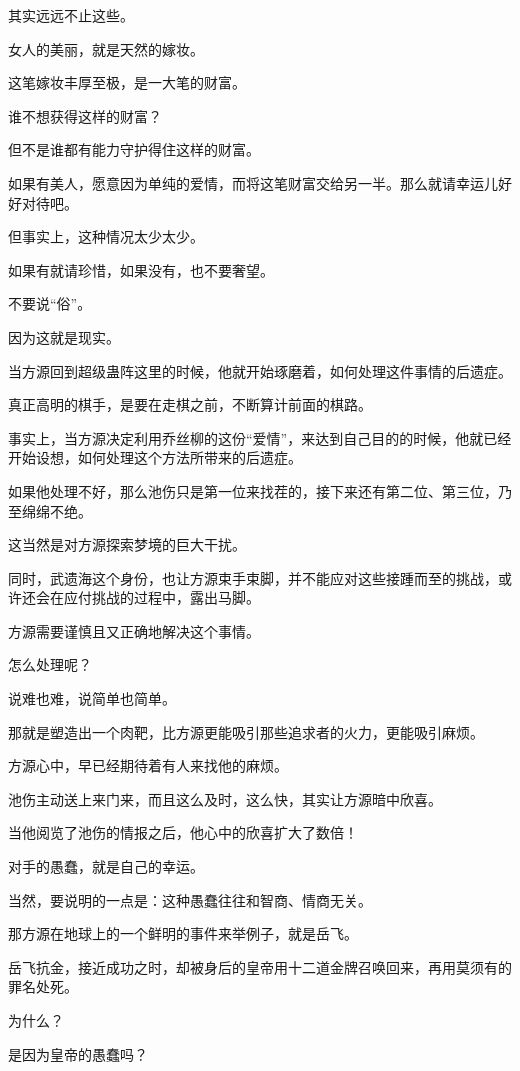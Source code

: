\begin{this_body}
其实远远不止这些。

女人的美丽，就是天然的嫁妆。

这笔嫁妆丰厚至极，是一大笔的财富。

谁不想获得这样的财富？

但不是谁都有能力守护得住这样的财富。

如果有美人，愿意因为单纯的爱情，而将这笔财富交给另一半。那么就请幸运儿好好对待吧。

但事实上，这种情况太少太少。

如果有就请珍惜，如果没有，也不要奢望。

不要说“俗”。

因为这就是现实。

当方源回到超级蛊阵这里的时候，他就开始琢磨着，如何处理这件事情的后遗症。

真正高明的棋手，是要在走棋之前，不断算计前面的棋路。

事实上，当方源决定利用乔丝柳的这份“爱情”，来达到自己目的的时候，他就已经开始设想，如何处理这个方法所带来的后遗症。

如果他处理不好，那么池伤只是第一位来找茬的，接下来还有第二位、第三位，乃至绵绵不绝。

这当然是对方源探索梦境的巨大干扰。

同时，武遗海这个身份，也让方源束手束脚，并不能应对这些接踵而至的挑战，或许还会在应付挑战的过程中，露出马脚。

方源需要谨慎且又正确地解决这个事情。

怎么处理呢？

说难也难，说简单也简单。

那就是塑造出一个肉靶，比方源更能吸引那些追求者的火力，更能吸引麻烦。

方源心中，早已经期待着有人来找他的麻烦。

池伤主动送上来门来，而且这么及时，这么快，其实让方源暗中欣喜。

当他阅览了池伤的情报之后，他心中的欣喜扩大了数倍！

对手的愚蠢，就是自己的幸运。

当然，要说明的一点是：这种愚蠢往往和智商、情商无关。

那方源在地球上的一个鲜明的事件来举例子，就是岳飞。

岳飞抗金，接近成功之时，却被身后的皇帝用十二道金牌召唤回来，再用莫须有的罪名处死。

为什么？

是因为皇帝的愚蠢吗？


\end{this_body}
